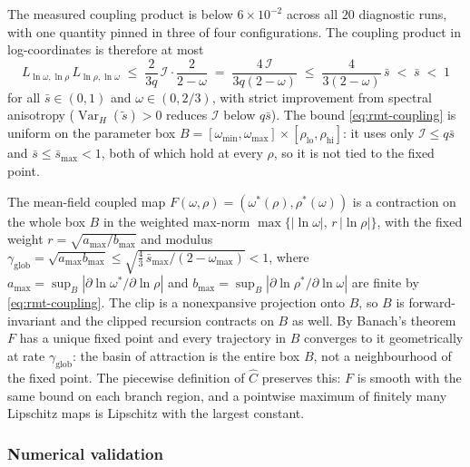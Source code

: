 The measured coupling product is below $6\times10^{-2}$ across all $20$ diagnostic runs, with one quantity pinned in three of four configurations.
The coupling product in log-coordinates is therefore at most
\begin{equation}
\label{eq:rmt-coupling}
L_{\ln \omega, \ln\rho}\,L_{\ln\rho, \ln \omega}
\;\le\; \frac{2}{3q}\,\mathcal I \cdot \frac{2}{2-\omega}
\;=\; \frac{4\,\mathcal I}{3q(2-\omega)}
\;\le\; \frac{4}{3(2-\omega)}\,\bar s
\;<\; \bar s
\;<\; 1
\end{equation}
for all $\bar s \in (0,1)$ and $\omega \in (0, 2/3)$, with strict improvement from spectral anisotropy ($\operatorname{Var}_H(\tilde s) > 0$ reduces $\mathcal I$ below $q\bar s$).
The bound \eqref{eq:rmt-coupling} is uniform on the parameter box $B = [\omega_{\min},\omega_{\max}]\times[\rho_{\mathrm{lo}},\rho_{\mathrm{hi}}]$: it uses only $\mathcal I \le q\bar s$ and $\bar s \le \bar s_{\max} < 1$, both of which hold at every $\rho$, so it is not tied to the fixed point.
\begin{corollary}
\label{cor:global}
The mean-field coupled map $F(\omega,\rho) = (\omega^*(\rho),\rho^*(\omega))$ is a contraction on the whole box $B$ in the weighted max-norm $\max\{|\ln\omega|,\, r\,|\ln\rho|\}$, with the fixed weight $r = \sqrt{a_{\max}/b_{\max}}$ and modulus $\gamma_{\mathrm{glob}} = \sqrt{a_{\max}b_{\max}} \le \sqrt{\tfrac{4}{3}\,\bar s_{\max}/(2-\omega_{\max})} < 1$, where $a_{\max} = \sup_B |\partial\ln\omega^*/\partial\ln\rho|$ and $b_{\max} = \sup_B |\partial\ln\rho^*/\partial\ln\omega|$ are finite by \eqref{eq:rmt-coupling}.
The clip is a nonexpansive projection onto $B$, so $B$ is forward-invariant and the clipped recursion contracts on $B$ as well.
By Banach's theorem $F$ has a unique fixed point and every trajectory in $B$ converges to it geometrically at rate $\gamma_{\mathrm{glob}}$: the basin of attraction is the entire box $B$, not a neighbourhood of the fixed point.
The piecewise definition of $\widehat C$ preserves this: $F$ is smooth with the same bound on each branch region, and a pointwise maximum of finitely many Lipschitz maps is Lipschitz with the largest constant.
\end{corollary}

\subsubsection{Numerical validation}
\label{app:rmt-validation}

